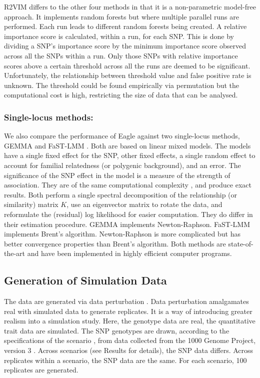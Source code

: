 \documentclass{article}
\begin{document}
  
R2VIM differs to the other four methods in that it is a non-parametric model-free approach. It implements  
random forests but where multiple parallel runs are performed. Each run leads to 
different random forests being created.  A relative importance score is calculated, within a run,  for each SNP. This is done by dividing a SNP's 
importance score by the minimum importance score observed across all the SNPs within a run. 
Only those SNPs with relative importance scores above a certain threshold across all the runs are deemed to be significant. 
Unfortunately, the relationship between threshold value and false positive rate is unknown. The threshold could be found empirically via permutation 
but the computational cost is high, restricting the size of data that can be analysed. 



\subsubsection{Single-locus methods:} We also compare the performance of Eagle against two single-locus methods, GEMMA \citep{zhou2012genome} and FaST-LMM \citep{lippert2011fast}. Both are based on linear mixed models. The models have a single fixed effect for the SNP,  other fixed effects, 
a single random effect to account for familial relatedness (or polygenic background), and an error. The significance of the SNP effect in the model 
is a measure of the strength of association.  They are of the same computational complexity \citep{zhou2012genome}, and produce exact results.  
Both perform a single spectral decomposition of the relationship (or similarity) matrix $K$, use  an eigenvector matrix to rotate the data, 
and reformulate the (residual) log likelihood for easier computation. They do differ in their estimation procedure. GEMMA implements Newton-Raphson. 
FaST-LMM implements Brent's algorithm. Newton-Raphson is more complicated but has better convergence properties than Brent's algorithm. 
Both methods are state-of-the-art and have been implemented in highly efficient computer programs. 



\subsection{Generation of Simulation Data}

The data are generated via data perturbation \citep{zhao2007arabidopsis}. 
Data perturbation amalgamates real with simulated data to generate replicates. 
It is a way of introducing greater realism into a simulation study. 
 Here, the genotype data are real, the 
quantitative trait data are simulated. 
 The SNP genotypes are drawn, 
according to the specifications of the scenario , from data collected from the 1000 Genome Project, version 3   \citep{10002010map}. 
Across scenarios (see Results for details), the SNP data differs. Across replicates within a scenario, the SNP data are the same. For each scenario, 100 replicates are generated. 
\end{document}

